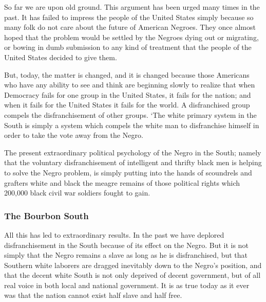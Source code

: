 \documentclass[letterpaper,10pt,english]{jupyterBook}
\begin{document}
\sphinxAtStartPar
{}

\sphinxAtStartPar
So far we are upon old ground. This argument has been urged many times in the past. It has failed to impress the people of the United States simply because so many folk do not care about the future of American Negroes. They once almost hoped that the problem would be settled by the Negroes dying out or migrating, or bowing in dumb submission to any kind of treatment that the people of the United States decided to give them.

\sphinxAtStartPar
But, today, the matter is changed, and it is changed because those Americans who have any ability to see and think are beginning slowly to realize that when Democracy fails for one group in the United States, it fails for the nation; and when it fails for the United States it fails for the world. A disfranchised group compels the disfranchisement of other groups. ‘The white primary system in the South is simply a system which compels the white man to disfranchise himself in order to take the vote away from the Negro.

\sphinxAtStartPar
The present extraordinary political psychology of the Negro in the South; namely that the voluntary disfranchisement of intelligent and thrifty black men is helping to solve the Negro problem, is simply putting into the hands of scoundrels and grafters white and black the meagre remains of those political rights which 200,000 black civil war soldiers fought to gain.


\subsubsection{The Bourbon South}
\label{\detokenize{Volumes/36/05/negro_citizen:the-bourbon-south}}
\sphinxAtStartPar
All this has led to extraordinary results. In the past we have deplored disfranchisement in the South because of its effect on the Negro. But it is not simply that the Negro remains a slave as long as he is disfranchised, but that Southern white laborers are dragged inevitably down to the Negro’s position, and that the decent white South is not only deprived of decent government, but of all real voice in both local and national government. It is as true today as it ever was that the nation cannot exist half slave and half free.
\end{document}
